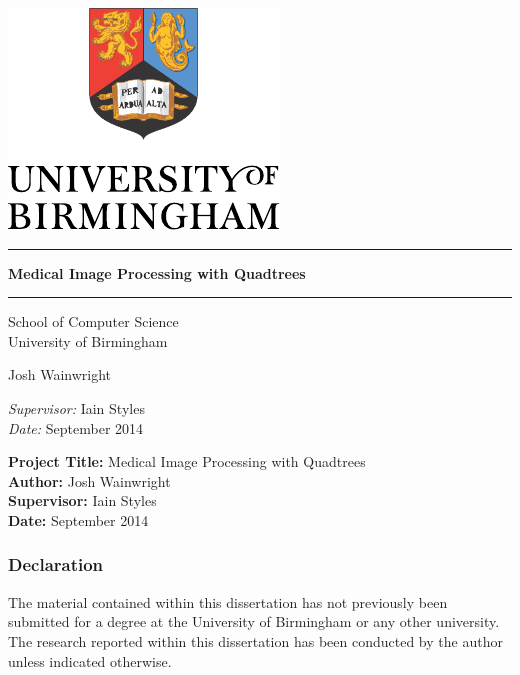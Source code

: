 
\begin{titlepage}
	\begin{center}
		\vspace*{\fill}

		\centering
		\includegraphics[scale=1.0]{Logo.pdf}
		\vfill

		\hrule
		{\LARGE\bf Medical Image Processing with Quadtrees\\[0.4cm]}
		\hrule

		\vfill
		\large
		School of Computer Science\\
		University of Birmingham

		\vfill
		Josh Wainwright
		\vfill

		\vfill
		\textit{Supervisor:} Iain Styles \\
		\vfill
		\textit{Date:} September 2014
		\vfill
		\vfill

	\end{center}
\end{titlepage}
\restoregeometry%

\thispagestyle{empty}

\textbf{Project Title:} Medical Image Processing with Quadtrees \\
\textbf{Author:} Josh Wainwright \\
\textbf{Supervisor:} Iain Styles \\
\textbf{Date:} September 2014 \\
\textbf{}
\vfill
\vfill

\subsubsection*{Declaration}

The material contained within this dissertation has not previously been
submitted for a degree at the University of Birmingham or any other university.
The research reported within this dissertation has been conducted by the author
unless indicated otherwise.\\

